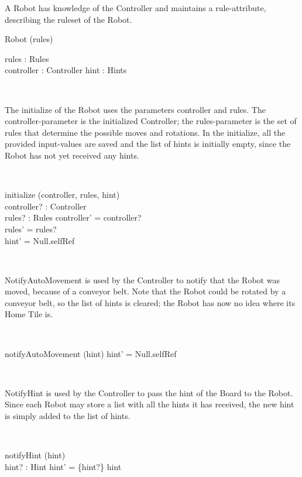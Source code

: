 \documentclass[12pt]{article}
\begin{document}
A Robot has knowledge of the Controller and maintains a rule-attribute, describing the ruleset of the Robot.
\begin{class}{Robot}
\upharpoonright (rules) \\
\begin{state}
rules : Rules \\
controller : Controller
hint : Hints
\end{state}\\
\begin{classcom}
The initialize of the Robot uses the parameters controller and rules. The controller-parameter is the initialized Controller; the rules-parameter is the set of rules that determine the possible moves and rotations. In the initialize, all the provided input-values are saved and the list of hints is initially empty, since the Robot has not yet received any hints.
\end{classcom} \\
\begin{schema}{initialize}
\Delta (controller, rules, hint) \\
controller? : Controller \\
rules? : Rules
\where
controller' = controller? \\
rules' = rules? \\
hint' = Null.selfRef
\end{schema}\\
\begin{classcom}
NotifyAutoMovement is used by the Controller to notify that the Robot was moved, because of a conveyor belt. Note that the Robot could be rotated by a conveyor belt, so the list of hints is cleared; the Robot has now no idea where its Home Tile is.
\end{classcom} \\
\begin{schema}{notifyAutoMovement}
\Delta (hint)
\where
hint' = Null.selfRef
\end{schema}\\
\begin{classcom}
NotifyHint is used by the Controller to pass the hint of the Board to the Robot. Since each Robot may store a list with all the hints it has received, the new hint is simply added to the list of hints.
\end{classcom} \\
\begin{schema}{notifyHint}
\Delta (hint) \\
hint? : Hint
\where
hint' = \{hint?\} \union hint
\end{schema}
\end{class}
\end{document}
